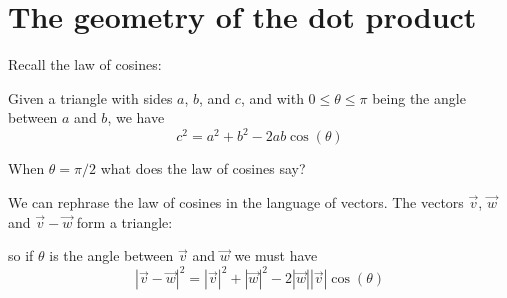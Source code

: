\documentclass{ximera}
\begin{document}
\section{The geometry of the dot product}

Recall the law of cosines:

\begin{theorem}
  Given a triangle with sides $a$, $b$, and $c$, and with $0\le\theta\le\pi$
  being the angle between $a$ and $b$, we have
  \[
  c^2 = a^2+b^2-2ab\cos(\theta)
  \]
\end{theorem}
\begin{question}
  When $\theta = \pi/2$ what does the law of cosines say?
  \begin{prompt}
    \begin{multipleChoice}
    \end{multipleChoice}
  \end{prompt}
\end{question}

We can rephrase the law of cosines in the language of vectors.  The
vectors $\vec{v}$, $\vec{w}$ and $\vec{v} - \vec{w}$ form a triangle:
\begin{image}
\end{image}
so if $\theta$ is the angle between $\vec{v}$ and $\vec{w}$ we must
have
\[
|\vec{v} - \vec{w}|^2=|\vec{v}|^2+|\vec{w}|^2-2|\vec{w}||\vec{v}|\cos(\theta)
\]
\end{document}
